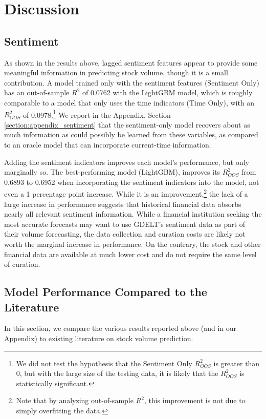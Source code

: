 \documentclass[12pt]{article}
\begin{document}
\newpage
\section{Discussion}
\label{section:discussion}
\subsection{Sentiment}
As shown in the results above, lagged sentiment features appear to provide some meaningful information in predicting stock volume, though it is a small contribution. A model trained only with the sentiment features (Sentiment Only) has an out-of-sample $R^2$ of 0.0762 with the LightGBM model, which is roughly comparable to a model that only uses the time indicators (Time Only), with an $R^2_{OOS}$ of 0.0978.\footnote{We did not test the hypothesis that the Sentiment Only $R^2_{OOS}$ is greater than 0, but with the large size of the testing data, it is likely that the $R^2_{OOS}$ is statistically significant.} We report in the Appendix, Section \ref{section:appendix_sentiment} that the sentiment-only model recovers about as much information as could possibly be learned from these variables, as compared to an oracle model that can incorporate current-time information.

Adding the sentiment indicators improves each model's performance, but only marginally so. The best-performing model (LightGBM), improves its $R^2_{OOS}$ from 0.6893 to 0.6952 when incorporating the sentiment indicators into the model, not even a 1 percentage point increase. While it is an improvement,\footnote{Note that by analyzing out-of-sample $R^2$, this improvement is not due to simply overfitting the data.} the lack of a large increase in performance suggests that historical financial data absorbs nearly all relevant sentiment information. While a financial institution seeking the most accurate forecasts may want to use GDELT's sentiment data as part of their volume forecasting, the data collection and curation costs are likely not worth the marginal increase in performance. On the contrary, the stock and other financial data are available at much lower cost and do not require the same level of curation.

\subsection{Model Performance Compared to the Literature}
In this section, we compare the various results reported above (and in our Appendix) to existing literature on stock volume prediction.
\end{document}
